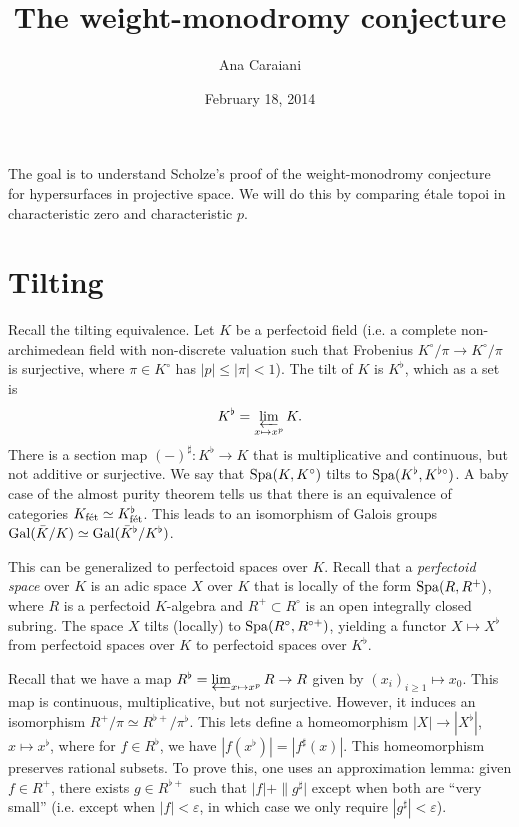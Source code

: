 \documentclass{article}
\title{The weight-monodromy conjecture}
\author{Ana Caraiani}
\date{February 18, 2014}
\begin{document}
\maketitle





The goal is to understand Scholze's proof of the weight-monodromy conjecture 
for hypersurfaces in projective space. We will do this by comparing \'etale 
topoi in characteristic zero and characteristic $p$. 





\section{Tilting}

Recall the tilting equivalence. Let $K$ be a perfectoid field (i.e. a complete 
non-archimedean field with non-discrete valuation such that Frobenius 
$K^\circ/\pi \to K^\circ/\pi$ is surjective, where $\pi\in K^\circ$ has 
$|p|\leqslant |\pi| <1$). The tilt of $K$ is $K^\flat$, which as a set is 
\[
  K^\flat = \varprojlim_{x\mapsto x^p} K .
\]
There is a section map $(-)^\sharp:K^\flat \to K$ that is multiplicative and 
continuous, but not additive or surjective. We say that 
$\operatorname{Spa}(K,K^\circ)$ tilts to $\operatorname{Spa}(K^\flat,K^{\flat\circ})$. A baby case of the 
almost purity theorem tells us that there is an equivalence of categories 
$K_{\textnormal{f\'et}} \simeq K^\flat_{\textnormal{f\'et}}$. This leads to an isomorphism of Galois groups 
$\operatorname{Gal}(\bar K/K) \simeq \operatorname{Gal}(\bar K^\flat/K^\flat)$. 

This can be generalized to perfectoid spaces over $K$. Recall that a 
\emph{perfectoid space} over $K$ is an adic space $X$ over $K$ that is locally 
of the form $\operatorname{Spa}(R,R^+)$, where $R$ is a perfectoid $K$-algebra and 
$R^+\subset R^\circ$ is an open integrally closed subring. The space $X$ tilts 
(locally) to $\operatorname{Spa}(R^\circ,R^{\circ +})$, yielding a functor $X\mapsto X^\flat$ 
from perfectoid spaces over $K$ to perfectoid spaces over $K^\flat$. 

Recall that we have a map $R^\flat = \varprojlim_{x\mapsto x^p} R \to R$ given 
by $(x_i)_{i\geqslant 1} \mapsto x_0$. This map is continuous, multiplicative, 
but not surjective. However, it induces an isomorphism 
$R^+/\pi \simeq R^{\flat +}/\pi^\flat$. This lets define a homeomorphism 
$|X|\to |X^\flat|$, $x\mapsto x^\flat$, where for $f\in R^\flat$, we have 
$|f(x^\flat)| = |f^\sharp(x)|$. This homeomorphism preserves rational 
subsets. To prove this, one uses an approximation lemma: given $f\in R^+$, 
there exists $g\in R^{\flat +}$ such that $|f|+\|g^\sharp|$ except when both 
are ``very small'' (i.e. except when $|f|<\varepsilon$, in which case we only 
require $|g^\sharp|<\varepsilon$). 
\end{document}
